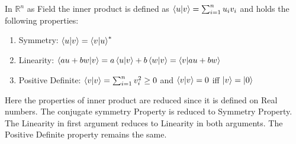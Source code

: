 \begin{example}
    In $\mathbb{R}^n$ as Field the inner product is defined as $\braket{u|v}=\sum_{i=1}^{n}u_iv_i$
    and holds the following properties:
    \begin{enumerate}
        \item Symmetry: $\braket{u|v}=\braket{v|u}^*$
        \item Linearity: $\braket{au+bw|v}=a\braket{u|v}+b\braket{w|v}=\braket{v|au+bw}$
        \item Positive Definite: $\braket{v|v}=\sum_{i=1}^{n}v_i^2\geq 0$ and $\braket{v|v}=0$ iff $\ket{v}=\ket{0}$
    \end{enumerate}
    Here the properties of inner product are reduced since it is defined on Real numbers. The conjugate symmetry Property
    is reduced to Symmetry Property. The Linearity in first argument reduces to Linearity in both arguments. 
    The Positive Definite property remains the same.
\end{example}
